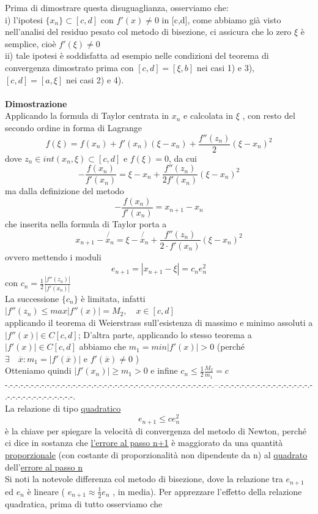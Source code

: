 \documentclass[12pt]{article}
\begin{document}
Prima di dimostrare questa disuguaglianza, osserviamo che:\\
i) l'ipotesi $\{x_n\} \subset [c,d]$ con $f'(x)\neq0$ in [c,d], come abbiamo già visto nell'analisi del residuo pesato col metodo di bisezione, ci assicura che lo zero $\xi$ è semplice, cioè $f'(\xi) \neq 0$\\
ii) tale ipotesi è soddisfatta ad esempio nelle condizioni del teorema di convergenza dimostrato prima con $[c,d] = [\xi, b]$ nei casi 1) e 3), $[c,d] = [a,\xi]$ nei casi 2) e 4).\\\\
\textbf{Dimostrazione}\\
Applicando la formula di Taylor centrata in $x_n$ e calcolata in $\xi $ , con resto del secondo ordine in forma di Lagrange
\[f(\xi)=f(x_n)+f'(x_n)(\xi-x_n)+\frac{f''(z_n)}{2}(\xi-x_n)^2\]
dove $z_n\in int(x_n,\xi)\subset [c,d]$ e $f(\xi)=0$, da cui 
\[-\frac{f(x_n)}{f'(x_n)}=\xi-x_n+\frac{f''(z_n)}{2f'(x_n)}(\xi-x_n)^2\]
ma dalla definizione del metodo
\[-\frac{f(x_n)}{f'(x_n)}=x_{n+1}-x_n\]
che inserita nella formula di Taylor porta a 
\[x_{n+1}-\not{x_n }=\xi-\not{x_n}+\frac{f''(z_n)}{2\cdot f'(x_n)}(\xi-x_n)^2\]
ovvero mettendo i moduli
\[e_{n+1}=|x_{n+1}-\xi|=c_ne_n^2\]
con $ c_n=\frac{1}{2}\frac{|f''(z_n)|}{|f'(x_n)|}$\\
La successione $\{c_n\}$ è limitata, infatti $|f''(z_n)\leq max|f''(x)|=M_2,\quad x\in [c,d]$\\
applicando il teorema di Weierstrass sull'esistenza di massimo e minimo assoluti a $ |f''(x)|\in C[c,d]$; 
D'altra parte, applicando lo stesso teorema a  $ |f'(x)|\in C[c,d]$ abbiamo che $m_1=min|f'(x)|>0$ (perché $\exists \quad\overline{x}: m_1=|f'(\overline{x})| $  e    $f'(\overline{x})\neq 0$   )\\
Otteniamo quindi $|f'(x_n)|\geq m_1>0$    e infine $c_n \leq \frac{1}{2}\frac{M_2}{m_1}=c$ \\
-.-.-.-.-.-.-.-.-.-.-.-.-.-.-.-.-.-.-.-.-.-.-.-.-.-.-.-.-.-.-.-.-.-.-.-.-.-.-.-.--.-.-.-.-.-.-.-.-.-.-.-.-.-.-.-.-.-.-.-.-.-.-.-.-.-.-.-.-.-.-.-.\\
La relazione di tipo \underline{quadratico}
\[e_{n+1}\leq ce_n^2\]
è la chiave per spiegare la velocità di convergenza del metodo di Newton, perché ci dice in sostanza che \underline{l'errore  al passo n+1} è maggiorato da una quantità \underline{proporzionale} (con costante di proporzionalità non dipendente da n) al \underline{quadrato} dell'\underline{errore al passo n} \\
Si noti la notevole differenza col metodo di bisezione, dove la relazione tra $e_{n+1}$ ed $e_n$ è lineare ( $e_{n+1} \approx \frac{1}{2} e_n$ , in media). Per apprezzare l'effetto della relazione quadratica, prima di tutto osserviamo che \\
\end{document}
